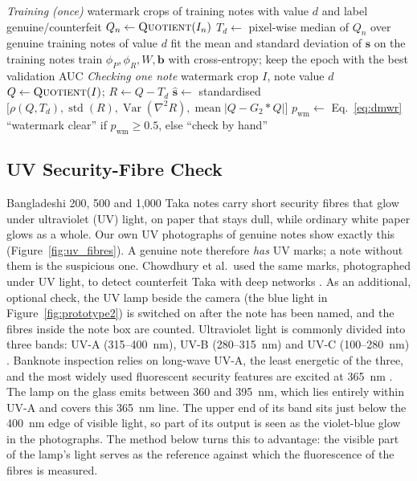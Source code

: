 \begin{algorithm}[!htbp]
\caption{Denomination-matched watermark residual (DMWR)}
\label{alg:dmwr}
\begin{algorithmic}[1]
\Statex \textit{Training (once)}
\Require watermark crops of training notes with value $d$ and label genuine/counterfeit
 \State $Q_n \gets \textsc{Quotient}(I_n)$  \EndFor
{} \State $T_d \gets$ pixel-wise median of $Q_n$ over genuine training notes of value $d$  \EndFor
\State fit the mean and standard deviation of $\mathbf{s}$ on the training notes
\State train $\phi_P, \phi_R, W, \mathbf{b}$ with cross-entropy; keep the epoch with the best validation AUC
\Statex \textit{Checking one note}
\Require watermark crop $I$, note value $d$
\State $Q \gets \textsc{Quotient}(I)$; \; $R \gets Q - T_d$ 
\State $\hat{\mathbf{s}} \gets$ standardised $\big[\rho(Q,T_d), \operatorname{std}(R), \operatorname{Var}(\nabla^2 R), \operatorname{mean}|Q - G_2 * Q|\big]$
\State $p_{\text{wm}} \gets$ Eq.~\eqref{eq:dmwr}
\State \Return ``watermark clear'' if $p_{\text{wm}} \ge 0.5$, else ``check by hand''
\end{algorithmic}
\end{algorithm}


\subsection{UV Security-Fibre Check}
\label{sec:uv_method}
Bangladeshi 200, 500 and 1,000 Taka notes carry short security fibres that glow under ultraviolet (UV) light, on paper that stays dull, while ordinary white paper glows as a whole. Our own UV photographs of genuine notes show exactly this (Figure~\ref{fig:uv_fibres}). A genuine note therefore \emph{has} UV marks; a note without them is the suspicious one. Chowdhury et al.\ used the same marks, photographed under UV light, to detect counterfeit Taka with deep networks \cite{chowdhury2022uvink}. As an additional, optional check, the UV lamp beside the camera (the blue light in Figure~\ref{fig:prototype2}) is switched on after the note has been named, and the fibres inside the note box are counted. Ultraviolet light is commonly divided into three bands: UV-A (315--400~nm), UV-B (280--315~nm) and UV-C (100--280~nm) \cite{who2002uvi}. Banknote inspection relies on long-wave UV-A, the least energetic of the three, and the most widely used fluorescent security features are excited at 365~nm \cite{mutanen2003luminescent}. The lamp on the glass emits between 360 and 395~nm, which lies entirely within UV-A and covers this 365~nm line. The upper end of its band sits just below the 400~nm edge of visible light, so part of its output is seen as the violet-blue glow in the photographs. The method below turns this to advantage: the visible part of the lamp's light serves as the reference against which the fluorescence of the fibres is measured.

